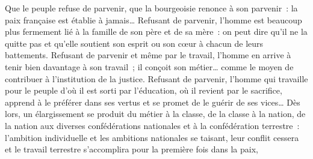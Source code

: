 \documentclass[french,twoside]{book} %
\newenvironment{quoteblock}%
  {\begin{quoting}}
  {\end{quoting}}
\newenvironment{quotebar}{%
    \def\FrameCommand{{\color{rubric!10!}\vrule width 0.5em} \hspace{0.9em}}%
    \def\OuterFrameSep{\itemsep} %
    \MakeFramed {\advance\hsize-\width \FrameRestore}
  }%
  {%
    \endMakeFramed
  }
\renewenvironment{quoteblock}%
  {%
    \savenotes
    \setstretch{0.9}
    \normalfont
    \begin{quotebar}
  }
  {%
    \end{quotebar}
    \spewnotes
  }
\begin{document}
\begin{quoteblock}
 \noindent Que le peuple refuse de parvenir, que la bourgeoisie renonce à son parvenir : la paix française est établie à jamais… Refusant de parvenir, l’homme est beaucoup plus fermement lié à la famille de son père et de sa mère : on peut dire qu’il ne la quitte pas et qu’elle soutient son esprit ou son cœur à chacun de leurs battements. Refusant de parvenir et même par le travail, l’homme en arrive à tenir bien davantage à son travail ; il conçoit son métier… comme le moyen de contribuer à l’institution de la justice. Refusant de parvenir, l’homme qui travaille pour le peuple d’où il est sorti par l’éducation, où il revient par le sacrifice, apprend à le préférer dans ses vertus et se promet de le guérir de ses vices… Dès lors, un élargissement se produit du métier à la classe, de la classe à la nation, de la nation aux diverses confédérations nationales et à la confédération terrestre : l’ambition individuelle et les ambitions nationales se taisant, leur conflit cessera et le travail terrestre s’accomplira pour la première fois dans la paix,‌
 \end{quoteblock}
\end{document}
